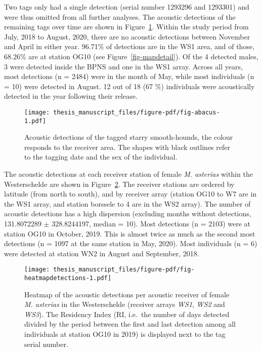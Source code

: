 \documentclass[
  authoryear,
  review,
  3p]{elsarticle}
\begin{document}
Two tags only had a single detection (serial number 1293296 and 1293301)
and were thus omitted from all further analyses. The acoustic detections
of the remaining tags over time are shown in Figure~\ref{fig-abacus}.
Within the study period from July, 2018 to August, 2020, there are no
acoustic detections between November and April in either year. 96.71\%
of detections are in the WS1 area, and of those, 68.26\% are at station
OG10 (see Figure~\ref{fig-mapdetail}). Of the 4 detected males, 3 were
detected inside the BPNS and one in the WS1 array. Across all years,
most detections (n = 2484) were in the month of May, while most
individuals (n = 10) were detected in August. 12 out of 18 (67 \%)
individuals were acoustically detected in the year following their
release.

\begin{figure}[H]

{\centering \texttt{[image: thesis\_manuscript\_files/figure-pdf/fig-abacus-1.pdf]}

}

\caption{\label{fig-abacus}Acoustic detections of the tagged starry
smooth-hounds, the colour responds to the receiver area. The shapes with
black outlines refer to the tagging date and the sex of the individual.}

\end{figure}

The acoustic detections at each receiver station of female \emph{M.
asterias} within the Westerschelde are shown in
Figure~\ref{fig-heatmapdetections}. The receiver stations are ordered by
latitude (from north to south), and by receiver array (station OG10 to
W7 are in the WS1 array, and station borssele to 4 are in the WS2
array). The number of acoustic detections has a high dispersion
(excluding months without detections, 131.8072289 \(\pm\) 328.8244197,
median = 10). Most detections (n = 2103) were at station OG10 in
October, 2019. This is almost twice as much as the second most
detections (n = 1097 at the same station in May, 2020). Most individuals
(n = 6) were detected at station WN2 in August and September, 2018.

\begin{figure}[H]

{\centering \texttt{[image: thesis\_manuscript\_files/figure-pdf/fig-heatmapdetections-1.pdf]}

}

\caption{\label{fig-heatmapdetections}Heatmap of the acoustic detections
per acoustic receiver of female \emph{M. asterias} in the Westerschelde
(receiver arrays \emph{WS1}, \emph{WS2} and \emph{WS3}). The Residency
Index (RI, i.e.~the number of days detected divided by the period
between the first and last detection among all individuals at station
OG10 in 2019) is displayed next to the tag serial number.}

\end{figure}
\end{document}
